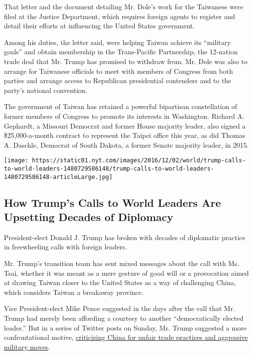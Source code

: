 That letter and the document detailing Mr. Dole's work for the Taiwanese
were filed at the Justice Department, which requires foreign agents to
register and detail their efforts at influencing the United States
government.

Among his duties, the letter said, were helping Taiwan achieve its
``military goals'' and obtain membership in the Trans-Pacific
Partnership, the 12-nation trade deal that Mr. Trump has promised to
withdraw from. Mr. Dole was also to arrange for Taiwanese officials to
meet with members of Congress from both parties and arrange access to
Republican presidential contenders and to the party's national
convention.

The government of Taiwan has retained a powerful bipartisan
constellation of former members of Congress to promote its interests in
Washington. Richard A. Gephardt, a Missouri Democrat and former House
majority leader, also signed a \$25,000-a-month contract to represent
the Taipei office this year, as did Thomas A. Daschle, Democrat of South
Dakota, a former Senate majority leader, in 2015.

\href{https://www.nytimes.com/interactive/2016/12/02/world/trump-calls-to-world-leaders.html}{}

\texttt{[image: https://static01.nyt.com/images/2016/12/02/world/trump-calls-to-world-leaders-1480729586148/trump-calls-to-world-leaders-1480729586148-articleLarge.jpg]}

\hypertarget{how-trumps-calls-to-world-leaders-are-upsetting-decades-of-diplomacy}{%
\subsection{How Trump's Calls to World Leaders Are Upsetting Decades of
Diplomacy}\label{how-trumps-calls-to-world-leaders-are-upsetting-decades-of-diplomacy}}

President-elect Donald J. Trump has broken with decades of diplomatic
practice in freewheeling calls with foreign leaders.

Mr. Trump's transition team has sent mixed messages about the call with
Ms. Tsai, whether it was meant as a mere gesture of good will or a
provocation aimed at drawing Taiwan closer to the United States as a way
of challenging China, which considers Taiwan a breakaway province.

Vice President-elect Mike Pence suggested in the days after the call
that Mr. Trump had merely been affording a courtesy to another
``democratically elected leader.'' But in a series of Twitter posts on
Sunday, Mr. Trump suggested a more confrontational motive,
\href{http://www.nytimes.com/2016/12/05/world/asia/china-donald-trump-taiwan-twitter.html}{criticizing
China for unfair trade practices and aggressive military moves}.

